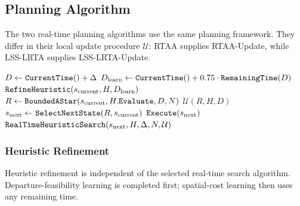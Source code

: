 \documentclass[11pt]{article}
\begin{document}
\subsection{Planning Algorithm}
\label{sec:real-time-search-framework}

The two real-time planning algorithms use the same planning framework. They differ in their local update procedure \(\mathcal{U}\): RTAA supplies \textsf{RTAA-Update}, while
LSS-LRTA supplies \textsf{LSS-LRTA-Update}.

\begin{algorithm}[H]
  \caption{Real-time heuristic search planning}
  \label{alg:real-time-heuristic-search}
  \(D \gets \FuncSty{CurrentTime}() + \Delta\)\;
  \(D_{\mathrm{learn}} \gets \FuncSty{CurrentTime}()
  + 0.75 \cdot \FuncSty{RemainingTime}(D)\)\;
  \(\FuncSty{RefineHeuristic}(s_{\mathrm{current}},H,D_{\mathrm{learn}})\)\;
  \(R \gets
  \FuncSty{BoundedAStar}(s_{\mathrm{current}},H.\FuncSty{Evaluate},D,N)\)\;
  \(\mathcal{U}(R,H,D)\)\;
  \(s_{\mathrm{next}} \gets
  \FuncSty{SelectNextState}(R,s_{\mathrm{current}})\)\;
  \(\FuncSty{Execute}(s_{\mathrm{next}})\)\;
  \(\FuncSty{RealTimeHeuristicSearch}(
    s_{\mathrm{next}},H,\Delta,N,\mathcal{U})\)\;
\end{algorithm}

\subsubsection{Heuristic Refinement}

Heuristic refinement is independent of the selected real-time search algorithm.
Departure-feasibility learning is completed first; spatial-cost learning then
uses any remaining time.

\begin{algorithm}[H]
  \caption{Incremental heuristic refinement}
  \label{alg:refine-heuristic}
\end{algorithm}
\end{document}
